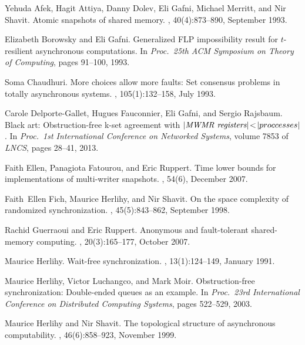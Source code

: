 \documentclass[11pt]{article}
\begin{document}
\begin{thebibliography}{10}

Yehuda Afek, Hagit Attiya, Danny Dolev, Eli Gafni, Michael Merritt, and Nir
  Shavit.
\newblock Atomic snapshots of shared memory.
, 40(4):873--890, September 1993.

Elizabeth Borowsky and Eli Gafni.
\newblock Generalized {FLP} impossibility result for $t$-resilient asynchronous
  computations.
\newblock In {\em Proc.~25th ACM Symposium on Theory of Computing}, pages
  91--100, 1993.

Soma Chaudhuri.
\newblock More choices allow more faults: Set consensus problems in totally
  asynchronous systems.
, 105(1):132--158, July 1993.

Carole Delporte-Gallet, Hugues Fauconnier, Eli Gafni, and Sergio Rajsbaum.
\newblock Black art: Obstruction-free k-set agreement with {$|\mbox{\it MWMR
  registers}|\!<\!|proccesses|$}.
\newblock In {\em Proc.~1st International Conference on Networked Systems},
  volume 7853 of {\em LNCS}, pages 28--41, 2013.

Faith Ellen, Panagiota Fatourou, and Eric Ruppert.
\newblock Time lower bounds for implementations of multi-writer snapshots.
, 54(6), December 2007.

Faith~Ellen Fich, Maurice Herlihy, and Nir Shavit.
\newblock On the space complexity of randomized synchronization.
, 45(5):843--862, September 1998.

Rachid Guerraoui and Eric Ruppert.
\newblock Anonymous and fault-tolerant shared-memory computing.
, 20(3):165--177, October 2007.

Maurice Herlihy.
\newblock Wait-free synchronization.
,
  13(1):124--149, January 1991.

Maurice Herlihy, Victor Luchangco, and Mark Moir.
\newblock Obstruction-free synchronization: Double-ended queues as an example.
\newblock In {\em Proc.~23rd International Conference on Distributed Computing
  Systems}, pages 522--529, 2003.

Maurice Herlihy and Nir Shavit.
\newblock The topological structure of asynchronous computability.
, 46(6):858--923, November 1999.


\end{thebibliography}
\end{document}
